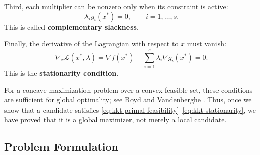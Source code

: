 \documentclass{article}
\numberwithin{equation}{section}
\begin{document}
Third, each multiplier can be nonzero only when its constraint is active:
\begin{equation}
    \label{eq:kkt-complementary-slackness}
    \lambda_i g_i(x^*)=0,
    \qquad i=1,\ldots,s.
\end{equation}
This is called \textbf{complementary slackness}.

Finally, the derivative of the Lagrangian with respect to $x$ must vanish:
\begin{equation}
    \label{eq:kkt-stationarity}
    \nabla_x\mathcal L(x^*,\lambda)
    =
    \nabla f(x^*)-\sum_{i=1}^s \lambda_i \nabla g_i(x^*)=0.
\end{equation}
This is the \textbf{stationarity condition}.

For a concave maximization problem over a convex feasible set, these
conditions are sufficient for global optimality; see Boyd and Vandenberghe
\cite[Chapter~5]{boyd-vandenberghe-2004}. Thus, once we show that a
candidate satisfies
\eqref{eq:kkt-primal-feasibility}--\eqref{eq:kkt-stationarity},
we have proved that it is a global maximizer, not merely a local candidate.

\subsection{Problem Formulation}
\end{document}
